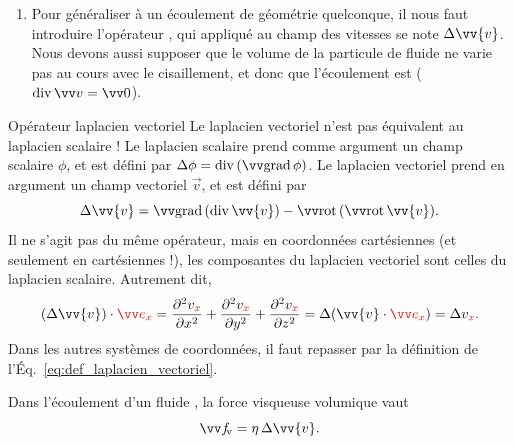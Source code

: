 \documentclass[12pt,fancy]{cours}
\begin{document}
\begin{enumerate}
\begin{align}
& \simeq \eta\frac{\partial^2 v_{x}}{\partial y^2}\underbrace{\d y\,\d S}_{\d V}\,\vv{e_{x}},
\end{align}
d’où l’on déduit l’expression de la force volumique,
\begin{equation}
\Vec{f}_{\rm v} = 
\frac{\d\vv{F}_{\rm{v},\mc{P}}}{\d V}=\eta \frac{\partial^2 v_{x}}{\partial y^2}\,\ex.
\end{equation}
\item Pour généraliser à un écoulement de géométrie quelconque, il nous faut introduire l’opérateur  , qui appliqué au champ des vitesses se note $\Delta\vv{v}$. Nous devons aussi supposer que le volume de la particule de fluide ne varie pas au cours avec le cisaillement, et donc que l’écoulement est  ($\dive{\Vec{v}} = \Vec{0}$).
\end{enumerate}

\begin{rappel}{Opérateur laplacien vectoriel}
Le laplacien vectoriel n'est pas équivalent au laplacien scalaire ! Le laplacien scalaire prend comme argument un champ scalaire $\phi$, et est défini par $\Delta \phi=\dive{(\grad{\phi})}$. Le laplacien vectoriel prend en argument un champ vectoriel $\Vec{v}$, et est défini par
\begin{equation}
\label{eq:def_laplacien_vectoriel}
\Delta \vv{v}=\grad{(\dive{\vv{v}})}-\rot{(\rot{\vv{v}})}.
\end{equation}
Il ne s'agit pas du même opérateur, mais en coordonnées cartésiennes (et seulement en cartésiennes !), les composantes du laplacien vectoriel sont celles du laplacien scalaire. Autrement dit,
\begin{equation}
(\Delta \vv{v})\cdot \JRouge{\ex}=\frac{\partial^2 v_{\JRouge{x}}}{\partial x^2}+\frac{\partial^2 v_{\JRouge{x}}}{\partial y^2}+\frac{\partial^2 v_{\JRouge{x}}}{\partial z^2}=\Delta(\vv{v}\cdot \JRouge{\ex})=\Delta v_{\JRouge{x}}.
\end{equation}
Dans les autres systèmes de coordonnées, il faut repasser par la définition de l'Éq.~\eqref{eq:def_laplacien_vectoriel}.
\end{rappel}


\begin{theorem}\label{form:visq}
Dans l’écoulement  d’un fluide , la force visqueuse volumique vaut
\begin{equation*}
\Vec{f}_{\!\rm v} = \eta\,\Delta\vv{v}.
\end{equation*}
\end{theorem}
\end{document}
